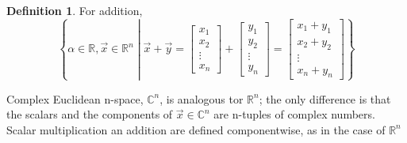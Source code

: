 \documentclass{book}
\theoremstyle{definition}
\newtheorem{definition}{Definition}[section]
\theoremstyle{remark}
\newcommand{\bb}[1]{\mathbb{#1}}
\begin{document}
\begin{definition}
    For addition, 
        \begin{equation*}
            \left \{ \alpha \in \bb{R}, \vec{x} \in \bb{R}^n \middle | \vec{x} + \vec{y} = \begin{bmatrix} x_1 \\ x_2 \\ \vdots \\ x_n \end{bmatrix} + \begin{bmatrix} y_1 \\ y_2 \\ \vdots \\ y_n \end{bmatrix} = \begin{bmatrix} x_1 + y_1 \\ x_2 + y_2 \\ \vdots \\ x_n + y_n \end{bmatrix} \right \}
        \end{equation*}
    
    Complex Euclidean n-space, $\bb{C}^n$, is analogous tor $\bb{R}^n$; the only difference is that the scalars and the components of $\vec{x} \in \bb{C}^n$ are n-tuples of complex numbers. Scalar multiplication an addition are defined componentwise, as in the case of $\bb{R}^n$
    \end{definition}
\end{document}
